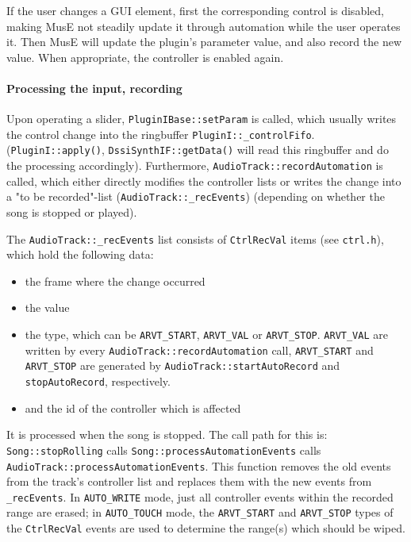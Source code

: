 \documentclass[a4paper]{report}
\newcommand{\sym}[1]{\texttt{#1}}
\newcommand{\file}[1]{\texttt{#1}}
\begin{document}
If the user changes a GUI element, first the corresponding control is
disabled, making MusE not steadily update it through automation
while the user operates it. Then MusE will update the plugin's parameter
value, and also record the new value. When appropriate, the controller
is enabled again.

\paragraph{Processing the input, recording}
Upon operating a slider, \sym{PluginIBase::setParam} is called,
which usually writes the control change into the ringbuffer
\sym{PluginI::\_controlFifo}. (\sym{PluginI::apply()},
\sym{DssiSynthIF::getData()} will read this ringbuffer and
do the processing accordingly). Furthermore, \sym{AudioTrack::recordAutomation}
is called, which either directly modifies the controller lists or writes
the change into a "to be recorded"-list (\sym{AudioTrack::\_recEvents})
(depending on whether the song is stopped or played).

The \sym{AudioTrack::\_recEvents} list consists of \sym{CtrlRecVal}
items (see \file{ctrl.h}), which hold the following data:
\begin{itemize}
\item the frame where the change occurred
\item the value
\item the type, which can be \sym{ARVT\_START}, \sym{ARVT\_VAL} or \sym{ARVT\_STOP}.
      \sym{ARVT\_VAL} are written by every \sym{AudioTrack::recordAutomation}
      call, \sym{ARVT\_START} and \sym{ARVT\_STOP} are generated by
      \sym{AudioTrack::startAutoRecord} and \sym{stopAutoRecord},
      respectively.
\item and the id of the controller which is affected
\end{itemize}
It is processed when the song is stopped. The call path for this is:
\sym{Song::stopRolling} calls \sym{Song::processAutomationEvents}
calls \sym{AudioTrack::processAutomationEvents}.
This function removes the old events from the track's controller list
and replaces them with the new events from \sym{\_recEvents}. In
\sym{AUTO\_WRITE} mode, just all controller events within the recorded
range are erased; in \sym{AUTO\_TOUCH} mode, the \sym{ARVT\_START}
and \sym{ARVT\_STOP} types of the \sym{CtrlRecVal} events are used
to determine the range(s) which should be wiped.
\end{document}

